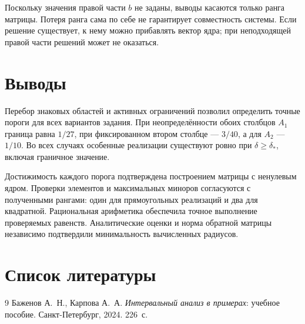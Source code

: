 \documentclass[12pt,a4paper]{article}
\begin{document}
Поскольку значения правой части $b$ не заданы, выводы касаются
только ранга матрицы. Потеря ранга сама по себе не гарантирует
совместность системы. Если решение существует, к нему можно
прибавлять вектор ядра; при неподходящей правой части решений
может не оказаться.

\section{Выводы}

Перебор знаковых областей и активных ограничений позволил
определить точные пороги для всех вариантов задания.
При неопределённости обоих столбцов $A_1$ граница равна $1/27$,
при фиксированном втором столбце --- $3/40$, а для $A_2$ --- $1/10$.
Во всех случаях особенные реализации существуют ровно при
$\delta\geq\delta_*$, включая граничное значение.

Достижимость каждого порога подтверждена построением матрицы
с ненулевым ядром. Проверки элементов и максимальных миноров
согласуются с полученными рангами: один для прямоугольных
реализаций и два для квадратной. Рациональная арифметика
обеспечила точное выполнение проверяемых равенств.
Аналитические оценки и норма обратной матрицы независимо
подтвердили минимальность вычисленных радиусов.

\section{Список литературы}

\begingroup
\makeatletter
\renewcommand{\section}[2]{}
\makeatother
\begin{thebibliography}{9}
Баженов А.~Н., Карпова А.~А.
\textit{Интервальный анализ в примерах}: учебное пособие.
Санкт-Петербург, 2024. 226~с.


\end{thebibliography}
\endgroup
\end{document}
